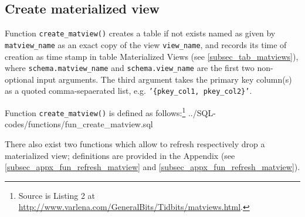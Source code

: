 \subsection{Create materialized view}\label{subsec_fun_create_matview}

Function \texttt{create\_matview()} creates a table if not exists named as given by \texttt{matview\_name} as an exact copy of the view \texttt{view\_name}, and records its time of creation as time stamp in table Materialized Views (see \ref{subsec_tab_matviews}),
where \texttt{schema.matview\_name} and \texttt{schema.view\_name} are the first two non-optional input arguments.
The third argument takes the primary key column(s) as a quoted comma-sepaerated list, e.g. \texttt{'\{pkey\_col1, pkey\_col2\}'}.

Function \texttt{create\_matview()} is defined as follows:\footnote{Source is Listing 2 at \url{http://www.varlena.com/GeneralBits/Tidbits/matviews.html}.} 
%
{../SQL-codes/functions/fun_create_matview.sql}

There also exist two functions which allow to refresh respectively drop a materialized view; definitions are provided in the Appendix (see \ref{subsec_appx_fun_refresh_matview} and \ref{subsec_appx_fun_refresh_matview}).
